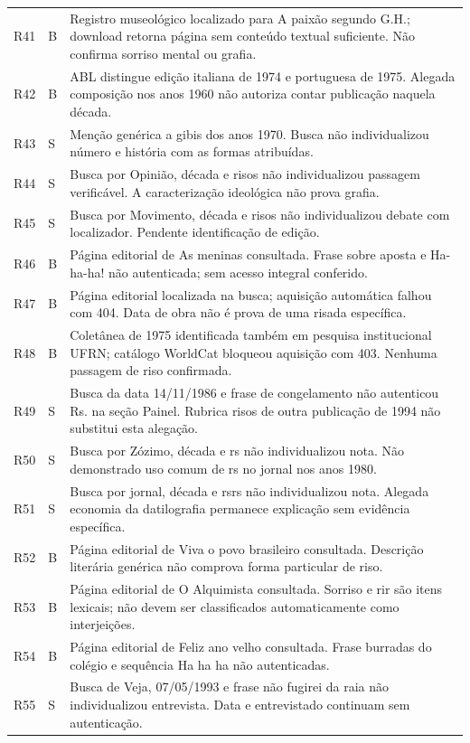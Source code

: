 \begin{longtable}{p{}p{}p{}}
R41 & B & Registro museológico localizado para A paixão segundo G.H.; download retorna página sem conteúdo textual suficiente. Não confirma sorriso mental ou grafia.\\
R42 & B & ABL distingue edição italiana de 1974 e portuguesa de 1975. Alegada composição nos anos 1960 não autoriza contar publicação naquela década.\\
R43 & S & Menção genérica a gibis dos anos 1970. Busca não individualizou número e história com as formas atribuídas.\\
R44 & S & Busca por Opinião, década e risos não individualizou passagem verificável. A caracterização ideológica não prova grafia.\\
R45 & S & Busca por Movimento, década e risos não individualizou debate com localizador. Pendente identificação de edição.\\
R46 & B & Página editorial de As meninas consultada. Frase sobre aposta e Ha-ha-ha! não autenticada; sem acesso integral conferido.\\
R47 & B & Página editorial localizada na busca; aquisição automática falhou com 404. Data de obra não é prova de uma risada específica.\\
R48 & B & Coletânea de 1975 identificada também em pesquisa institucional UFRN; catálogo WorldCat bloqueou aquisição com 403. Nenhuma passagem de riso confirmada.\\
R49 & S & Busca da data 14/11/1986 e frase de congelamento não autenticou Rs. na seção Painel. Rubrica risos de outra publicação de 1994 não substitui esta alegação.\\
R50 & S & Busca por Zózimo, década e rs não individualizou nota. Não demonstrado uso comum de rs no jornal nos anos 1980.\\
R51 & S & Busca por jornal, década e rsrs não individualizou nota. Alegada economia da datilografia permanece explicação sem evidência específica.\\
R52 & B & Página editorial de Viva o povo brasileiro consultada. Descrição literária genérica não comprova forma particular de riso.\\
R53 & B & Página editorial de O Alquimista consultada. Sorriso e rir são itens lexicais; não devem ser classificados automaticamente como interjeições.\\
R54 & B & Página editorial de Feliz ano velho consultada. Frase burradas do colégio e sequência Ha ha ha não autenticadas.\\
R55 & S & Busca de Veja, 07/05/1993 e frase não fugirei da raia não individualizou entrevista. Data e entrevistado continuam sem autenticação.\\

\end{longtable}
